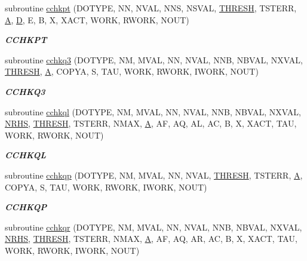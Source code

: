 \begin{DoxyCompactItemize}
subroutine \hyperlink{group__complex__lin_gaaf64b69fb532302f28fc51ddd194d192}{cchkpt} (D\+O\+T\+Y\+P\+E, N\+N, N\+V\+A\+L, N\+N\+S, N\+S\+V\+A\+L, \hyperlink{zlaqgs_8c_a0656018abfc9fa2821827415f5d5ea57}{T\+H\+R\+E\+S\+H}, T\+S\+T\+E\+R\+R, \hyperlink{classA}{A}, \hyperlink{odrpack_8h_a7dae6ea403d00f3687f24a874e67d139}{D}, E, B, X, X\+A\+C\+T, W\+O\+R\+K, R\+W\+O\+R\+K, N\+O\+U\+T)
\begin{DoxyCompactList}\small\item\em {\bfseries C\+C\+H\+K\+P\+T} \end{DoxyCompactList}\item 
subroutine \hyperlink{group__complex__lin_ga9221f1d36b247dfe2d4f919f005082bd}{cchkq3} (D\+O\+T\+Y\+P\+E, N\+M, M\+V\+A\+L, N\+N, N\+V\+A\+L, N\+N\+B, N\+B\+V\+A\+L, N\+X\+V\+A\+L, \hyperlink{zlaqgs_8c_a0656018abfc9fa2821827415f5d5ea57}{T\+H\+R\+E\+S\+H}, \hyperlink{classA}{A}, C\+O\+P\+Y\+A, S, T\+A\+U, W\+O\+R\+K, R\+W\+O\+R\+K, I\+W\+O\+R\+K, N\+O\+U\+T)
\begin{DoxyCompactList}\small\item\em {\bfseries C\+C\+H\+K\+Q3} \end{DoxyCompactList}\item 
subroutine \hyperlink{group__complex__lin_gacdb6cc39f72cd1c6b8de09d5dc8cb176}{cchkql} (D\+O\+T\+Y\+P\+E, N\+M, M\+V\+A\+L, N\+N, N\+V\+A\+L, N\+N\+B, N\+B\+V\+A\+L, N\+X\+V\+A\+L, \hyperlink{example__user_8c_aa0138da002ce2a90360df2f521eb3198}{N\+R\+H\+S}, \hyperlink{zlaqgs_8c_a0656018abfc9fa2821827415f5d5ea57}{T\+H\+R\+E\+S\+H}, T\+S\+T\+E\+R\+R, N\+M\+A\+X, \hyperlink{classA}{A}, A\+F, A\+Q, A\+L, A\+C, B, X, X\+A\+C\+T, T\+A\+U, W\+O\+R\+K, R\+W\+O\+R\+K, N\+O\+U\+T)
\begin{DoxyCompactList}\small\item\em {\bfseries C\+C\+H\+K\+Q\+L} \end{DoxyCompactList}\item 
subroutine \hyperlink{group__complex__lin_ga81baae6818b25be4b98827580aba6542}{cchkqp} (D\+O\+T\+Y\+P\+E, N\+M, M\+V\+A\+L, N\+N, N\+V\+A\+L, \hyperlink{zlaqgs_8c_a0656018abfc9fa2821827415f5d5ea57}{T\+H\+R\+E\+S\+H}, T\+S\+T\+E\+R\+R, \hyperlink{classA}{A}, C\+O\+P\+Y\+A, S, T\+A\+U, W\+O\+R\+K, R\+W\+O\+R\+K, I\+W\+O\+R\+K, N\+O\+U\+T)
\begin{DoxyCompactList}\small\item\em {\bfseries C\+C\+H\+K\+Q\+P} \end{DoxyCompactList}\item 
subroutine \hyperlink{group__complex__lin_ga48de033aaa11f5635b6c0880dc6c7ce3}{cchkqr} (D\+O\+T\+Y\+P\+E, N\+M, M\+V\+A\+L, N\+N, N\+V\+A\+L, N\+N\+B, N\+B\+V\+A\+L, N\+X\+V\+A\+L, \hyperlink{example__user_8c_aa0138da002ce2a90360df2f521eb3198}{N\+R\+H\+S}, \hyperlink{zlaqgs_8c_a0656018abfc9fa2821827415f5d5ea57}{T\+H\+R\+E\+S\+H}, T\+S\+T\+E\+R\+R, N\+M\+A\+X, \hyperlink{classA}{A}, A\+F, A\+Q, A\+R, A\+C, B, X, X\+A\+C\+T, T\+A\+U, W\+O\+R\+K, R\+W\+O\+R\+K, I\+W\+O\+R\+K, N\+O\+U\+T)

\end{DoxyCompactItemize}
